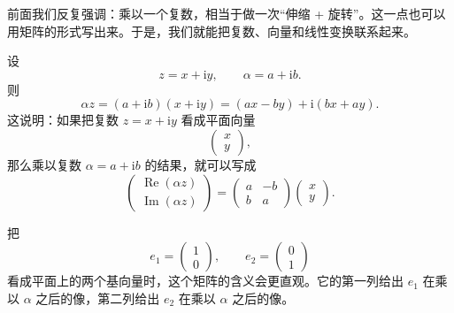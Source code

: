 前面我们反复强调：乘以一个复数，相当于做一次``伸缩 + 旋转''。这一点也可以用矩阵的形式写出来。于是，我们就能把复数、向量和线性变换联系起来。

设
\[
z=x+\mathrm{i}y,\qquad \alpha=a+\mathrm{i}b.
\]
则
\begin{equation}
    \alpha z=(a+\mathrm{i}b)(x+\mathrm{i}y)=(ax-by)+\mathrm{i}(bx+ay).
\end{equation}
这说明：如果把复数 $z=x+\mathrm{i}y$ 看成平面向量
\[
\begin{pmatrix}
    x\\
    y
\end{pmatrix},
\]
那么乘以复数 $\alpha=a+\mathrm{i}b$ 的结果，就可以写成
\begin{equation}\label{eq:complex-multiplication-matrix}
    \begin{pmatrix}
        \operatorname{Re}(\alpha z)\\
        \operatorname{Im}(\alpha z)
    \end{pmatrix}
    =
    \begin{pmatrix}
        a & -b\\
        b & a
    \end{pmatrix}
    \begin{pmatrix}
        x\\
        y
    \end{pmatrix}.
\end{equation}

把
\[
e_1=
\begin{pmatrix}
    1\\
    0
\end{pmatrix},
\qquad
e_2=
\begin{pmatrix}
    0\\
    1
\end{pmatrix}
\]
看成平面上的两个基向量时，这个矩阵的含义会更直观。它的第一列给出 $e_1$ 在乘以 $\alpha$ 之后的像，第二列给出 $e_2$ 在乘以 $\alpha$ 之后的像。

